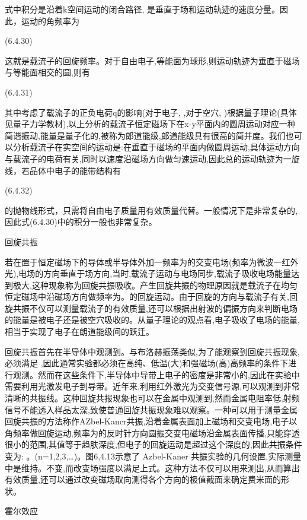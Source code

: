 式中积分是沿着k空间运动的闭合路径, 是垂直于场和运动轨迹的速度分量。因此，运动的角频率为

 	(6.4.30)

这就是载流子的回旋频率。对于自由电子,等能面为球形,则运动轨迹为垂直于磁场与等能面相交的圆,则有

 	(6.4.31)

其中考虑了载流子的正负电荷q的影响(对于电子, ,对于空穴, )根据量子理论(具体见量子力学教材),以上分析的载流子恒定磁场下在x-y平面内的圆周运动对应一种简谐振动,能量是量子化的,被称为郎道能级,郎道能级具有很高的简并度。我们也可以分析载流子在实空间的运动是:在垂直于磁场的平面内做圆周运动,具体运动方向与载流子的电荷有关,同时以速度沿磁场方向做匀速运动,因此总的运动轨迹为一旋线，若品体中电子的能带结构有

 	(6.4.32)

的抛物线形式，只需将自由电子质量用有效质量代替。一般情况下是非常复杂的,因此式(6.4.30)中的积分一般也非常复杂。





回旋共振

若在置于恒定磁场下的导体或半导体外加一频率为的交变电场(频率为微波一红外光),电场的方向垂直于场方向,当时,载流子运动与电场同步,载流子吸收电场能量达到极大,这种现象称为回旋共振吸收。产生回旋共振的物理原因就是载流子在均匀恒定磁场中沿磁场方向做频率为。的回旋运动。由于回旋的方向与载流子有关,回旋共振不仅可以测量载流子的有效质量,还可以根据出射波的偏振方向来判断电场的能量是被电子还是被空穴吸收的。从量子理论的观点看,电子吸收了电场的能量,相当于实现了电子在朗道能级间的跃迁。

回旋共振首先在半导体中观测到。与布洛赫振荡类似,为了能观察到回旋共振现象,必须满足 ,因此通常实验都必须在高纯、低温(大)和强磁场(高)高频率的条件下进行观测。然而在这些条件下,半导体中导带上电子的密度是非常小的,因此在实验中需要利用光激发电子到导带。近年来,利用红外激光为交变信号源,可以观测到非常清晰的共振线。这种回旋共报现象也可以在金属中观测到,然而金属电阻率低,射频信号不能透入样品太深,致使普通回旋共振现象难以观察。一种可以用于测量金属回旋共振的方法称作AZbel-Kancr共振,沿着金属表面加上磁场和交变电场,电子以角频率做回旋运动,频率为的反时针方向圆振交变电磁场沿金属表面传播,只能穿透很小的范围,其值等于趋肤深度,但电子的回旋运动是超过这个深度的,因此共振条件变为: 。(n=1,2,3,…)。图6,4.13示意了 Azbel-Kaner 共振实验的几何设置,实际测量中是维持。不变,而改变场强度以满足上式。这种方法不仅可以用来测出,从而算出有效质量,还可以通过改变磁场取向测得各个方向的极值截面来确定费米面的形状。



霍尔效应

